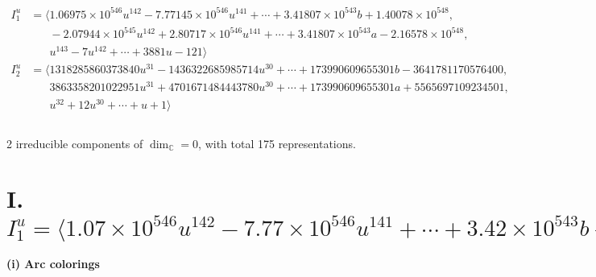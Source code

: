 \documentclass[1p]{elsarticle_modified}
\theoremstyle{definition}
\begin{document}
\begin{align*}
I^u_{1}&=\langle 
1.06975\times10^{546} u^{142}-7.77145\times10^{546} u^{141}+\cdots+3.41807\times10^{543} b+1.40078\times10^{548},\\
\phantom{I^u_{1}}&\phantom{= \langle  }-2.07944\times10^{545} u^{142}+2.80717\times10^{546} u^{141}+\cdots+3.41807\times10^{543} a-2.16578\times10^{548},\\
\phantom{I^u_{1}}&\phantom{= \langle  }u^{143}-7 u^{142}+\cdots+3881 u-121\rangle \\
I^u_{2}&=\langle 
1318285860373840 u^{31}-1436322685985714 u^{30}+\cdots+173990609655301 b-3641781170576400,\\
\phantom{I^u_{2}}&\phantom{= \langle  }3863358201022951 u^{31}+4701671484443780 u^{30}+\cdots+173990609655301 a+5565697109234501,\\
\phantom{I^u_{2}}&\phantom{= \langle  }u^{32}+12 u^{30}+\cdots+u+1\rangle \\
\\
\end{align*}
\raggedright * 2 irreducible components of $\dim_{\mathbb{C}}=0$, with total 175 representations.\\
\newpage
\renewcommand{\arraystretch}{1}
\centering \section*{I. $I^u_{1}= \langle 1.07\times10^{546} u^{142}-7.77\times10^{546} u^{141}+\cdots+3.42\times10^{543} b+1.40\times10^{548},\;-2.08\times10^{545} u^{142}+2.81\times10^{546} u^{141}+\cdots+3.42\times10^{543} a-2.17\times10^{548},\;u^{143}-7 u^{142}+\cdots+3881 u-121 \rangle$}
\flushleft \textbf{(i) Arc colorings}\\
\end{document}
